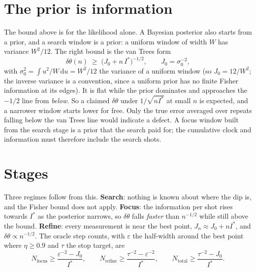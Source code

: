 \documentclass[11pt]{article}
\newcommand{\dd}{\mathrm{d}}
\newcommand{\Istar}{I^{\ast}}
\newcommand{\eps}{\varepsilon}
\begin{document}
\section{The prior is information}
The bound above is for the likelihood alone. A Bayesian posterior also starts from a prior, and a search window is a
prior: a uniform window of width $W$ has variance $W^2/12$. The right bound is the van Trees form
\begin{equation}
  \delta\theta(n)\;\ge\;\big(J_0+n\,\Istar\big)^{-1/2},\qquad J_0=\sigma_0^{-2},
\end{equation}
with $\sigma_0^2=\int u^2/W\,\dd u=W^2/12$ the variance of a uniform window (so $J_0=12/W^2$; the inverse variance is a
convention, since a uniform prior has no finite Fisher information at its edges). It is flat while the prior dominates and approaches the $-1/2$ line from
\emph{below}. So a claimed $\delta\theta$ under $1/\sqrt{n\Istar}$ at small $n$ is expected, and a narrower window
starts lower for free. Only the true error averaged over repeats falling below the van Trees line would indicate a
defect. A focus window built from the search stage is a prior that the search paid for; the cumulative clock and
information must therefore include the search shots.

\section{Stages}
Three regimes follow from this. \textbf{Search}: nothing is known about where the dip is, and the Fisher bound does not
apply. \textbf{Focus}: the information per shot rises towards $\Istar$ as the posterior narrows, so $\delta\theta$ falls
\emph{faster} than $n^{-1/2}$ while still above the bound. \textbf{Refine}: every measurement is near the best point,
$J_n\approx J_0+n\Istar$, and $\delta\theta\propto n^{-1/2}$. The oracle step counts, with $\eps$ the half-width around
the best point where $\eta\ge0.9$ and $\tau$ the stop target, are
\begin{equation}
  N_{\mathrm{focus}}\ge\frac{\eps^{-2}-J_0}{\Istar},\qquad
  N_{\mathrm{refine}}\ge\frac{\tau^{-2}-\eps^{-2}}{\Istar},\qquad
  N_{\mathrm{total}}\ge\frac{\tau^{-2}-J_0}{\Istar}.
\end{equation}
\end{document}
